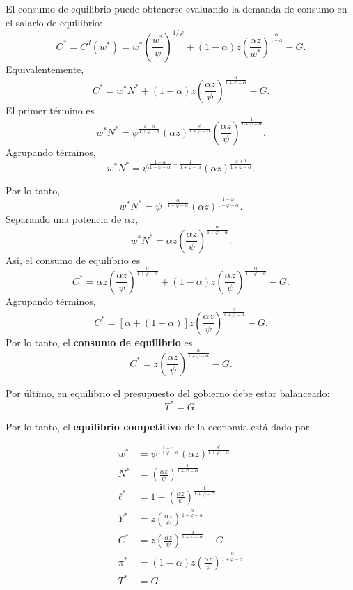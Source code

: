 \documentclass[11pt]{article}
\begin{document}
El consumo de equilibrio puede obtenerse evaluando la demanda de consumo en el salario de equilibrio:
\[
C^*
=
C^d(w^*)
=
w^*
\left(
\frac{w^*}{\psi}
\right)^{1/\varphi}
+
(1-\alpha)z
\left(
\frac{\alpha z}{w^*}
\right)^{\frac{\alpha}{1-\alpha}}
-G.
\]
Equivalentemente,
\[
C^*
=
w^*N^*
+
(1-\alpha)z
\left(
\frac{\alpha z}{\psi}
\right)^{\frac{\alpha}{1+\varphi-\alpha}}
-G.
\]
El primer término es
\[
w^*N^*
=
\psi^{\frac{1-\alpha}{1+\varphi-\alpha}}
(\alpha z)^{\frac{\varphi}{1+\varphi-\alpha}}
\left(
\frac{\alpha z}{\psi}
\right)^{\frac{1}{1+\varphi-\alpha}}.
\]
Agrupando términos,
\[
w^*N^*
=
\psi^{
\frac{1-\alpha}{1+\varphi-\alpha}
-
\frac{1}{1+\varphi-\alpha}
}
(\alpha z)^{
\frac{\varphi+1}{1+\varphi-\alpha}
}.
\]

Por lo tanto,
\[
w^*N^*
=
\psi^{-\frac{\alpha}{1+\varphi-\alpha}}
(\alpha z)^{
\frac{1+\varphi}{1+\varphi-\alpha}
}.
\]
Separando una potencia de $\alpha z$,
\[
w^*N^*
=
\alpha z
\left(
\frac{\alpha z}{\psi}
\right)^{\frac{\alpha}{1+\varphi-\alpha}}.
\]
Así, el consumo de equilibrio es
\[
C^*
=
\alpha z
\left(
\frac{\alpha z}{\psi}
\right)^{\frac{\alpha}{1+\varphi-\alpha}}
+
(1-\alpha)z
\left(
\frac{\alpha z}{\psi}
\right)^{\frac{\alpha}{1+\varphi-\alpha}}
-G.
\]
Agrupando términos,
\[
C^*
=
[\alpha+(1-\alpha)]
z
\left(
\frac{\alpha z}{\psi}
\right)^{\frac{\alpha}{1+\varphi-\alpha}}
-G.
\]
Por lo tanto, el \textbf{consumo de equilibrio} es
\[
\boxed{
C^*
=
z
\left(
\frac{\alpha z}{\psi}
\right)^{\frac{\alpha}{1+\varphi-\alpha}}
-G
}.
\]

Por último, en equilibrio el presupuesto del gobierno debe estar balanceado:
\[
\boxed{
T^*=G
}.
\]

Por lo tanto, el \textbf{equilibrio competitivo} de la economía está dado por

$$
\boxed{
    \begin{aligned}
w^*
&=
\psi^{\frac{1-\alpha}{1+\varphi-\alpha}}
(\alpha z)^{\frac{\varphi}{1+\varphi-\alpha}}
\\
N^*
&=
\left(
\frac{\alpha z}{\psi}
\right)^{\frac{1}{1+\varphi-\alpha}}
\\
\ell^*
&=
1-
\left(
\frac{\alpha z}{\psi}
\right)^{\frac{1}{1+\varphi-\alpha}}
\\
Y^*
&=
z
\left(
\frac{\alpha z}{\psi}
\right)^{\frac{\alpha}{1+\varphi-\alpha}}
\\
C^*
&=
z
\left(
\frac{\alpha z}{\psi}
\right)^{\frac{\alpha}{1+\varphi-\alpha}}
-G
\\
\pi^*
&=
(1-\alpha)z
\left(
\frac{\alpha z}{\psi}
\right)^{\frac{\alpha}{1+\varphi-\alpha}}
\\
T^*&=G
    \end{aligned}
}
$$
\end{document}
